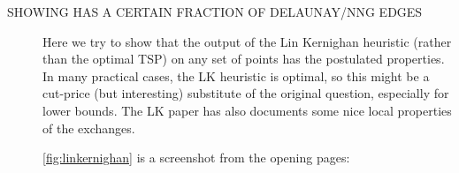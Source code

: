 \begin{appendices}
\begin{description}



\item[\color{red} SHOWING \cite{lin1973effective} HAS A CERTAIN FRACTION OF DELAUNAY/NNG EDGES] 
     Here we try to show that the output of the Lin Kernighan heuristic (rather than the optimal TSP) on any set of points has the postulated properties. In many practical 
     cases, the LK heuristic is optimal, so this might be a cut-price (but interesting) substitute of the original question, especially for lower bounds. 
     The LK paper has also documents some nice local properties of the exchanges.
     \newpage 

     \autoref{fig:linkernighan} is a screenshot from the opening pages:
 
\renewcommand\fbox{\fcolorbox{black}{white}}
\setlength\fboxrule{0.1pt}
   

\end{description}
\end{appendices}
